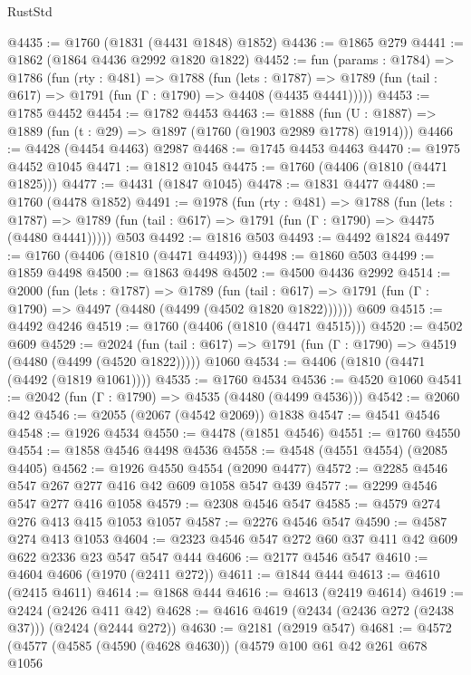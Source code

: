 \begin{lexlean}{RustStd}
\begin{coremodule}
@4435 := @1760 (@1831 (@4431 @1848) @1852)
@4436 := @1865 @279
@4441 := @1862 (@1864 @4436 @2992 @1820 @1822)
@4452 := fun (params : @1784) =>
  @1786
    (fun (rty : @481) =>
    @1788
      (fun (lets : @1787) =>
      @1789 (fun (tail : @617) => @1791 (fun (Γ : @1790) => @4408 (@4435 @4441)))))
@4453 := @1785 @4452
@4454 := @1782 @4453
@4463 := @1888 (fun (U : @1887) => @1889 (fun (t : @29) => @1897 (@1760 (@1903 @2989 @1778) @1914)))
@4466 := @4428 (@4454 @4463) @2987
@4468 := @1745 @4453 @4463
@4470 := @1975 @4452 @1045
@4471 := @1812 @1045
@4475 := @1760 (@4406 (@1810 (@4471 @1825)))
@4477 := @4431 (@1847 @1045)
@4478 := @1831 @4477
@4480 := @1760 (@4478 @1852)
@4491 := @1978
    (fun (rty : @481) =>
    @1788
      (fun (lets : @1787) =>
      @1789 (fun (tail : @617) => @1791 (fun (Γ : @1790) => @4475 (@4480 @4441)))))
    @503
@4492 := @1816 @503
@4493 := @4492 @1824
@4497 := @1760 (@4406 (@1810 (@4471 @4493)))
@4498 := @1860 @503
@4499 := @1859 @4498
@4500 := @1863 @4498
@4502 := @4500 @4436 @2992
@4514 := @2000
    (fun (lets : @1787) =>
    @1789
      (fun (tail : @617) => @1791 (fun (Γ : @1790) => @4497 (@4480 (@4499 (@4502 @1820 @1822))))))
    @609
@4515 := @4492 @4246
@4519 := @1760 (@4406 (@1810 (@4471 @4515)))
@4520 := @4502 @609
@4529 := @2024
    (fun (tail : @617) => @1791 (fun (Γ : @1790) => @4519 (@4480 (@4499 (@4520 @1822)))))
    @1060
@4534 := @4406 (@1810 (@4471 (@4492 (@1819 @1061))))
@4535 := @1760 @4534
@4536 := @4520 @1060
@4541 := @2042 (fun (Γ : @1790) => @4535 (@4480 (@4499 @4536)))
@4542 := @2060 @42
@4546 := @2055 (@2067 (@4542 @2069)) @1838
@4547 := @4541 @4546
@4548 := @1926 @4534
@4550 := @4478 (@1851 @4546)
@4551 := @1760 @4550
@4554 := @1858 @4546 @4498 @4536
@4558 := @4548 (@4551 @4554) (@2085 @4405)
@4562 := @1926 @4550 @4554 (@2090 @4477)
@4572 := @2285 @4546 @547 @267 @277 @416 @42 @609 @1058 @547 @439
@4577 := @2299 @4546 @547 @277 @416 @1058
@4579 := @2308 @4546 @547
@4585 := @4579 @274 @276 @413 @415 @1053 @1057
@4587 := @2276 @4546 @547
@4590 := @4587 @274 @413 @1053
@4604 := @2323 @4546 @547 @272 @60 @37 @411 @42 @609 @622 @2336 @23 @547 @547 @444
@4606 := @2177 @4546 @547
@4610 := @4604 @4606 (@1970 (@2411 @272))
@4611 := @1844 @444
@4613 := @4610 (@2415 @4611)
@4614 := @1868 @444
@4616 := @4613 (@2419 @4614)
@4619 := @2424 (@2426 @411 @42)
@4628 := @4616 @4619 (@2434 (@2436 @272 (@2438 @37))) (@2424 (@2444 @272))
@4630 := @2181 (@2919 @547)
@4681 := @4572
    (@4577
      (@4585
        (@4590 (@4628 @4630))
        (@4579
          @100
          @61
          @42
          @261
          @678
          @1056

\end{coremodule}
\end{lexlean}
